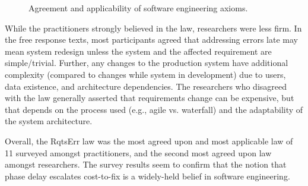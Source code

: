 \begin{figure}[!ht]
\begin{center}
\end{center}
\caption{Agreement and applicability of software engineering axioms.}
\label{fig:survey_results}
\end{figure}

While the practitioners strongly believed in the law, researchers were less firm. In the free response texts, most participants agreed that addressing errors late may mean system redesign unless the system and the affected requirement are simple/trivial. Further, any changes to the production system have additional complexity (compared to changes while system in development) due to users, data existence, and architecture dependencies. The researchers who disagreed with the law generally asserted that requirements change can be expensive, but that depends on the process used (e.g., agile vs. waterfall) and the adaptability of the system architecture.

Overall, the RqtsErr law was the most agreed upon and most applicable law of 11 surveyed amongst practitioners, and the second most agreed upon law amongst researchers. The survey results seem to confirm that the notion that phase delay escalates cost-to-fix is a widely-held belief in software engineering.